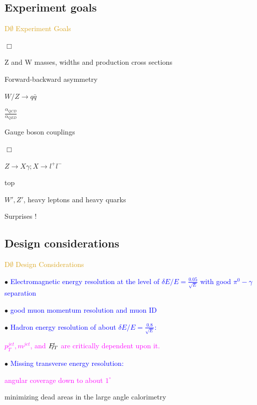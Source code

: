 \subsection{Experiment goals}
\begin{frame}{\textcolor{Goldenrod}{D$\emptyset$ Experiment Goals}}
  \itt
\item[$\Box$] 
\itt
\item Z and W masses, widths and production cross sections
\item Forward-backward asymmetry
\item $W/Z \to q\bar{q}$
\item $\frac{\alpha_{QCD}}{\alpha_{QED}}$ 
\item Gauge boson couplings
  \tti

\item[$\Box$] \\
  \itt
\item $Z \to X \gamma; X\to l^+l^-$
\item top
\item {}
\item {}
\item $W', Z'$, heavy leptons and heavy quarks
\item Surprises !
  \tti
  \tti
\end{frame}  

\subsection{Design considerations}
\begin{frame}{\textcolor{Goldenrod}{D$\emptyset$ Design Considerations}}
  \itt
\item[$\bullet$]\textcolor{blue}{Electromagnetic energy resolution at
    the level of $\delta E / E = \frac{0.05}{\sqrt{E}}$ with good
    $\pi^0-\gamma$ separation}
\item[$\bullet$] \textcolor{blue}{good muon momentum resolution and
    muon ID}
\item[$\bullet$] \textcolor{Blue}{Hadron energy resolution of about
    $\delta E / E = \frac{0.8}{\sqrt{E}}$:} {\small
    \itt
  \item \textcolor{Magenta}{$p^{jet}_T, m^{jet}$, and
      $\slashed{E_{T}}$ are critically dependent upon it.} \tti }
\item[$\bullet$] \textcolor{Blue}{Missing transverse energy
    resolution:} {\small
    \itt
  \item \textcolor{Magenta}{angular coverage down to about
      $1^{\circ}$}
  \item minimizing dead areas in the large angle calorimetry
    \tti }
  \tti   
\end{frame}

